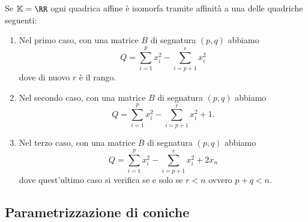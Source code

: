 \documentclass[11pt]{scrartcl}
\newcommand{\KK}{\mathbb{K}}
\begin{document}
	\begin{proposition}
		Se $\KK=\RR$ ogni quadrica affine è isomorfa tramite affinità a una delle quadriche seguenti:
		\begin{enumerate}
			\item Nel primo caso, con una matrice $B$ di segnatura $(p,q)$ abbiamo
			$$Q=\sum_{i=1}^{p}x_i^2-\sum_{i=p+1}^{r}x_i^2$$
			dove di nuovo $r$ è il rango.
			\item Nel secondo caso, con una matrice $B$ di segnatura $(p,q)$ abbiamo
			$$Q=\sum_{i=1}^{p}x_i^2-\sum_{i=p+1}^{r}x_i^2+1.$$
			\item Nel terzo caso, con una matrice $B$ di segnatura $(p,q)$ abbiamo
			$$Q=\sum_{i=1}^{p}x_i^2-\sum_{i=p+1}^{r}x_i^2+2x_n$$
			dove quest'ultimo caso si verifica se e solo se $r<n$ ovvero $p+q<n$.
		\end{enumerate} 
	\end{proposition}
	
	\subsection{Parametrizzazione di coniche}
	
\end{document}
